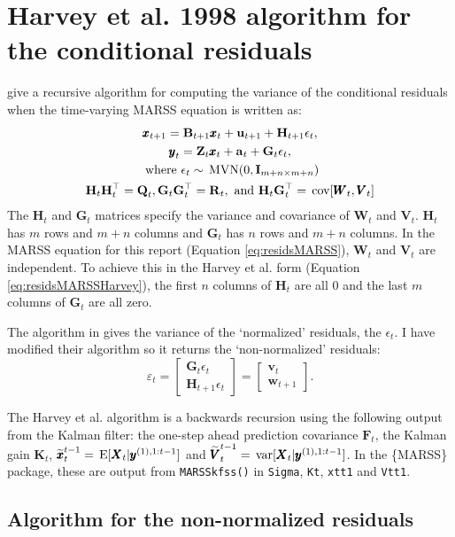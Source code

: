 \documentclass[]{article}
\def\UPS{\mbox{\boldmath $\Upsilon$}}
\def\XI{\mbox{\boldmath $\Xi$}}
\def\BB{\mbox{$\mathbf B$}}	\def\bb{\mbox{$\mathbf b$}} \def\Bb{\mbox{$\mathbf J$}} \def\Ba{\mbox{$\mathbf L$}} \def\Bm{\UPS}
\def\E{\,\textup{\textrm{E}}}
\def\FF{\mbox{$\mathbf F$}} \def\ff{\mbox{$\mathbf f$}}
\def\GG{\mbox{$\mathbf G$}}	\def\gg{\mbox{$\mathbf g$}}
\def\HH{\mbox{$\mathbf H$}}	\def\hh{\mbox{$\mathbf h$}}
\def\II{\mbox{$\mathbf I$}} \def\ii{\mbox{$\mathbf i$}}
\def\KK{\mbox{$\mathbf K$}}
\def\MVN{\,\textup{\textrm{MVN}}}
\def\QQ{\mbox{$\mathbf Q$}}	 \def\qq{\mbox{$\mathbf q$}} \def\Qb{\mbox{$\mathbf G$}}  \def\Qm{\mathbb{Q}}
\def\RR{\mbox{$\mathbf R$}}	 \def\rr{\mbox{$\mathbf r$}} \def\Rb{\mbox{$\mathbf H$}}	\def\Rm{\mathbb{R}}
\def\VV{\mbox{$\pmb{V}$}}	\def\vv{\mbox{$\pmb{v}$}}
\def\WW{\mbox{$\pmb{W}$}}	\def\ww{\mbox{$\pmb{w}$}}
\def\XX{\mbox{$\pmb{X}$}}	\def\xx{\mbox{$\pmb{x}$}}
\def\ZZ{\mbox{$\mathbf Z$}}	\def\zz{\mbox{$\mathbf z$}}	\def\Zb{\mbox{$\mathbf M$}} \def\Za{\mbox{$\mathbf N$}} \def\Zm{\XI}
\def\var{\,\textup{\textrm{var}}}
\def\cov{\,\textup{\textrm{cov}}}
\def\hatxttm{\widetilde{\xx}_t^{t-1}}
\def\hatVttm{\widetilde{\VV}_t^{t-1}}
\begin{document}
\section{Harvey et al. 1998 algorithm for the conditional residuals}
\citet[pgs 112-113]{Harveyetal1998} give a recursive algorithm for computing the variance of the conditional residuals when the time-varying MARSS equation is written as: 
\begin{equation}\label{eq:residsMARSSHarvey}
\begin{gathered}
\xx_{t+1} = \BB_{t+1}\xx_t + \uu_{t+1} + \HH_{t+1}\epsilon_{t},\\
\yy_t = \ZZ_t\xx_t + \aa_t + \GG_t\epsilon_t,\\
\mbox{ where } \epsilon_t \sim \MVN(0,\II_{m+n \times m+n}) \\
\HH_t\HH_t^\top=\QQ_t, \GG_t\GG_t^\top=\RR_t, \text{ and } \HH_t\GG_t^\top = \cov[\WW_t, \VV_t]
\end{gathered}
\end{equation}
The $\HH_t$ and $\GG_t$ matrices specify the variance and covariance of $\WW_t$ and $\VV_t$. $\HH_t$ has $m$  rows and $m+n$ columns and $\GG_t$ has $n$ rows and $m+n$ columns. In the MARSS equation for this report (Equation \ref{eq:residsMARSS}), $\WW_t$ and $\VV_t$ are independent. To achieve this in the Harvey et al. form (Equation \ref{eq:residsMARSSHarvey}), the first $n$ columns of $\HH_t$ are all 0 and the last $m$ columns of $\GG_t$ are all zero.  

The algorithm in \citet{Harveyetal1998} gives the variance of the `normalized' residuals, the $\epsilon_t$.  I have modified their algorithm so it  returns the `non-normalized' residuals:
$$\varepsilon_t=\begin{bmatrix}\GG_t\epsilon_t\\ \HH_{t+1}\epsilon_t\end{bmatrix}=\begin{bmatrix}\vv_t\\ \ww_{t+1} \end{bmatrix}.$$

The Harvey et al. algorithm is a backwards recursion using the following output from the Kalman filter: the one-step ahead prediction covariance $\FF_t$, the Kalman gain $\KK_t$, $\hatxttm=\E[\XX_t|\yy^{(1),1:{t-1}}]$ and $\hatVttm=\var[\XX_t|\yy^{(1),1:{t-1}}]$. In the \{MARSS\} package, these are output from \texttt{MARSSkfss()} in \texttt{Sigma}, \texttt{Kt}, \texttt{xtt1} and \texttt{Vtt1}.

\subsection{Algorithm for the non-normalized residuals}
\end{document}
